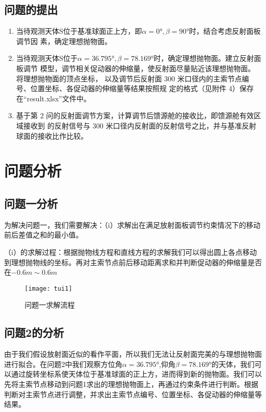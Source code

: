 \documentclass[withoutpreface,bwprint]{cumcmthesis} %
\numberwithin{equation}{subsection}
\begin{document}
\subsection{问题的提出}




\begin{enumerate}[label=(\arabic*)]
\item  当待观测天体S位于基准球面正上方，即$\alpha = 0°, \beta = 90°$时，结合考虑反射面板调节因
素，确定理想抛物面。
	
\item  当待观测天体S位于$\alpha = 36.795°, \beta = 78.169°$时，确定理想抛物面。建立反射面板调节
模型，调节相关促动器的伸缩量，使反射面尽量贴近该理想抛物面。将理想抛物面的顶点坐标，
以及调节后反射面 300 米口径内的主索节点编号、位置坐标、各促动器的伸缩量等结果按照规
定的格式（见附件 4）保存在“result.xlsx”文件中。
	
\item  基于第 2 问的反射面调节方案，计算调节后馈源舱的接收比，即馈源舱有效区域接收到
的反射信号与 300 米口径内反射面的反射信号之比，并与基准反射球面的接收比作比较。
	
\end{enumerate}




\section{问题分析}
\subsection{问题一分析}
为解决问题一，我们需要解决：（i）求解出在满足放射面板调节约束情况下的移动前后差值之和的最小值。

（i）的求解过程：根据抛物线方程和直线方程的求解我们可以得出圆上各点移动到理想抛物线的坐标。再对主索节点前后移动距离求和并判断促动器的伸缩量是否在$-0.6m\sim0.6m$


\begin{figure}[!h]
    \centering
    \texttt{[image: tui1]}
    \caption{问题一求解流程}
    \label{fig:1}
\end{figure}


\subsection{问题2的分析}
由于我们假设放射面近似的看作平面，所以我们无法让反射面完美的与理想抛物面进行拟合。在问题2中我们观察方位角$\alpha = 36.795°$,仰角$ \beta = 78.169°$的天体，我们可以通过旋转坐标系使天体位于基准球面的正上方，进而得到新的抛物面。我们可以先将主索节点移动到问题1求出的理想抛物面上，再通过约束条件进行判断。根据判断对主索节点进行调整，并求出主索节点编号、位置坐标、各促动器的伸缩量等结果。
\end{document}
